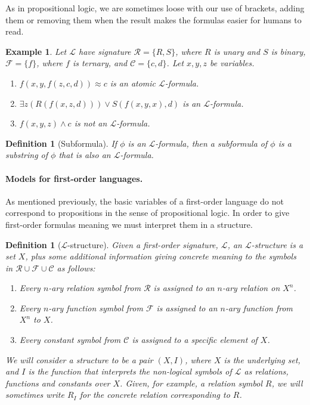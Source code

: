 \documentclass{article}
\theoremstyle{plain}
\newtheorem{definition}[theorem]{Definition}{\bfseries}{\upshape}
\newtheorem{example}[theorem]{Example}{\bfseries}{\upshape}
\newcommand{\cR}{\mathcal{R}}
\newcommand{\cF}{\mathcal{F}}
\newcommand{\cC}{\mathcal{C}}
\newcommand{\sL}{\mathscr{L}}
\begin{document}
As in propositional logic, we are sometimes loose with our use of brackets, adding them or removing them when the result makes the formulas easier for humans to read.
\begin{example}
Let $\sL$ have signature $\cR=\{R,S\}$, where $R$ is unary and $S$ is binary, $\cF=\{f\}$, where $f$ is ternary, and $\cC=\{c,d\}$. Let $x,y,z$ be variables. 
\begin{enumerate}
\item $f(x,y,f(z,c,d)) \approx c$ is an atomic $\sL$-formula.
\item $\exists z(R(f(x,z,d)))\vee S(f(x,y,x),d)$ is an $\sL$-formula.
\item $f(x,y,z) \wedge c$ is not an $\sL$-formula.
\end{enumerate}
\end{example}

\begin{definition}[Subformula]
If $\phi$ is an $\sL$-formula, then a \emph{subformula} of $\phi$ is a substring of $\phi$ that is also an $\sL$-formula.
\end{definition}

\paragraph{Models for first-order languages.}
As mentioned previously, the basic variables of a first-order language do not correspond to propositions in the sense of propositional logic. In order to give first-order formulas meaning we must interpret them in a structure.

\begin{definition}[$\sL$-structure]
Given a first-order signature, $\sL$, an $\sL$-\emph{structure}  is a set $X$, plus some additional information giving concrete meaning to the symbols in $\cR\cup \cF \cup \cC$ as follows: 
\begin{enumerate} 
\item Every $n$-ary relation symbol from $\cR$ is assigned to an $n$-ary relation on $X^n$. 
\item Every $n$-ary function symbol from $\cF$ is assigned to an $n$-ary function from $X^n$ to $X$.
\item Every constant symbol from $\cC$ is assigned to a specific element of $X$.
\end{enumerate}
We will consider a structure to be a pair $(X,I)$, where $X$ is the underlying set, and $I$ is the function that interprets the non-logical symbols of $\sL$ as relations, functions and constants over $X$. Given, for example, a relation symbol $R$, we will sometimes write $R_I$ for the concrete relation corresponding to $R$.
\end{definition}
\end{document}
